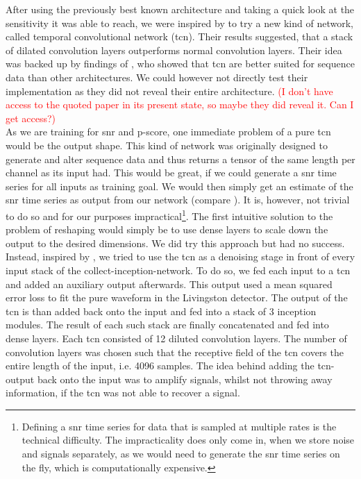 After using the previously best known architecture and taking a quick look at the sensitivity it was able to reach, we were inspired by \cite{tcn_idea} to try a new kind of network, called temporal convolutional network (\gls{tcn}). Their results suggested, that a stack of dilated convolution layers outperforms normal convolution layers. Their idea was backed up by findings of \cite{tcn_paper}, who showed that \gls{tcn} are better suited for sequence data than other architectures. We could however not directly test their implementation as they did not reveal their entire architecture. \textcolor{red}{(I don't have access to the quoted paper in its present state, so maybe they did reveal it. Can I get access?)}\\
As we are training for \gls{snr} and p-score, one immediate problem of a pure \gls{tcn} would be the output shape. This kind of network was originally designed to generate and alter sequence data and thus returns a tensor of the same length per channel as its input had. This would be great, if we could generate a \gls{snr} time series for all inputs as training goal. We would then simply get an estimate of the \gls{snr} time series as output from our network (compare \cite{cnn_magiacal_bullet}). It is, however, not trivial to do so and for our purposes impractical\footnote{Defining a \gls{snr} time series for data that is sampled at multiple rates is the technical difficulty. The impracticality does only come in, when we store noise and signals separately, as we would need to generate the \gls{snr} time series on the fly, which is computationally expensive.}. The first intuitive solution to the problem of reshaping would simply be to use dense layers to scale down the output to the desired dimensions. We did try this approach
 but had no success. Instead, inspired by \cite{dnn_denoising}, we tried to use the \gls{tcn} as a denoising stage in front of every input stack of the collect-inception-network. To do so, we fed each input to a \gls{tcn} and added an auxiliary output afterwards. This output used a mean squared error loss to fit the pure waveform in the Livingston detector. The output of the \gls{tcn} is than added back onto the input and fed into a stack of 3 inception modules. The result of each such stack are finally concatenated and fed into dense layers. Each \gls{tcn} consisted of 12 diluted convolution layers. The number of convolution layers was chosen such that the receptive field of the \gls{tcn} covers the entire length of the input, i.e. 4096 samples. The idea behind adding the \gls{tcn}-output back onto the input was to amplify signals, whilst not throwing away information, if the \gls{tcn} was not able to recover a signal.\\
